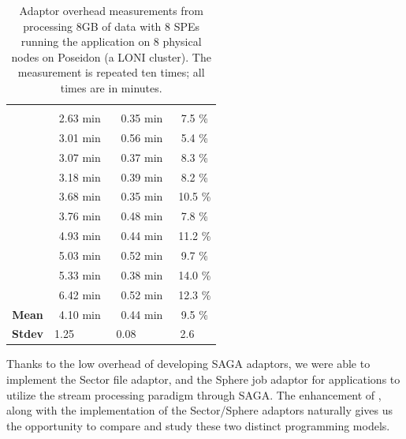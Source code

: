 \documentclass[3p,twocolumn]{elsarticle}
\begin{document}
\begin{table}[h!]
  \footnotesize
  \begin{tabular}{cccc}
    \hline         & \B{total}  & \B{abs. overhead} & \B{rel. overhead} \\
                   & 2.63 min   & 0.35 min            &   7.5  \%         \\
                   & 3.01 min   & 0.56 min            &   5.4  \%         \\
                   & 3.07 min   & 0.37 min            &   8.3  \%         \\
                   & 3.18 min   & 0.39 min            &   8.2  \%         \\
                   & 3.68 min   & 0.35 min            &  10.5  \%         \\
                   & 3.76 min   & 0.48 min            &   7.8  \%         \\
                   & 4.93 min   & 0.44 min            &  11.2  \%         \\
                   & 5.03 min   & 0.52 min            &   9.7  \%         \\
                   & 5.33 min   & 0.38 min            &  14.0  \%         \\
                   & 6.42 min   & 0.52 min            &  12.3  \%         \\
    \hline
    { {\bf Mean}}  & 4.10 min   & 0.44 min            &   9.5  \%         \\
    \hline
    { {\bf Stdev}} & 1.25 ~~~~~ & 0.08 ~~~~~          &   2.6 ~~          \\
    \hline \hline
  \end{tabular}
  \caption{Adaptor overhead measurements from processing 8GB of data with 8
  SPEs running the \wc application on 8 physical nodes on Poseidon (a
  LONI cluster). The measurement is repeated ten times; all times are in minutes.
  \label{tab:sphere_overhead}}
\end{table}


Thanks to the low overhead of developing SAGA adaptors, we were able
to implement the Sector file adaptor, and the Sphere job adaptor for
applications to utilize the stream processing paradigm through SAGA.
The enhancement of \sagamapreduce, along with the implementation of the
Sector/Sphere adaptors naturally gives us the opportunity to compare
and study these two distinct programming models.
\end{document}
